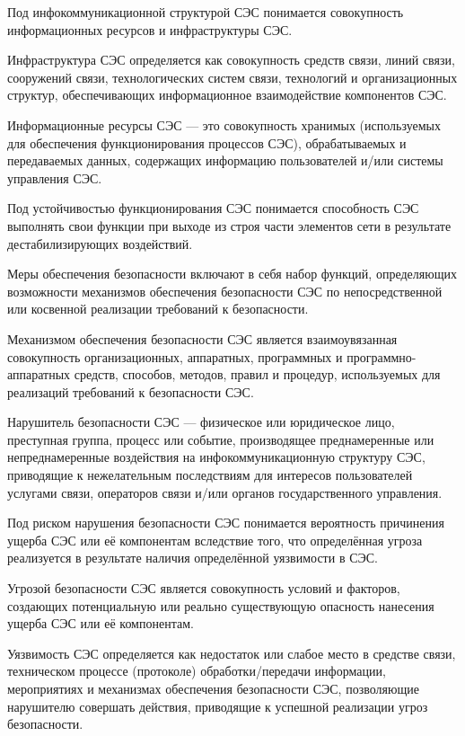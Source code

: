 \documentclass[12pt, russian, oneside, article]{ncc}
\begin{document}
Под инфокоммуникационной структурой СЭС понимается совокупность информационных ресурсов и инфраструктуры СЭС.

Инфраструктура СЭС определяется как совокупность средств связи, линий связи, сооружений связи, технологических систем связи, технологий и организационных структур, обеспечивающих информационное взаимодействие компонентов СЭС.

Информационные ресурсы СЭС --- это совокупность хранимых (используемых для обеспечения функционирования процессов СЭС), обрабатываемых и передаваемых данных, содержащих информацию пользователей и/или системы управления СЭС.

Под устойчивостью функционирования СЭС понимается способность СЭС выполнять свои функции при выходе из строя части элементов сети в результате дестабилизирующих воздействий.

Меры обеспечения безопасности включают в себя набор функций, определяющих возможности механизмов обеспечения безопасности СЭС по непосредственной или косвенной реализации требований к безопасности.

Механизмом обеспечения безопасности СЭС является взаимоувязанная совокупность организационных, аппаратных, программных и программно-аппаратных средств, способов, методов, правил и процедур, используемых для реализаций требований к безопасности СЭС.

Нарушитель безопасности СЭС --- физическое или юридическое лицо, преступная группа, процесс или событие, производящее преднамеренные или непреднамеренные воздействия на инфокоммуникационную структуру СЭС, приводящие к нежелательным последствиям для интересов пользователей услугами связи, операторов связи и/или органов государственного управления.

Под риском нарушения безопасности СЭС понимается вероятность причинения ущерба СЭС или её компонентам вследствие того, что определённая угроза реализуется в результате наличия определённой уязвимости в СЭС.

Угрозой безопасности СЭС является совокупность условий и факторов, создающих потенциальную или реально существующую опасность нанесения ущерба СЭС или её компонентам.

Уязвимость СЭС определяется как недостаток или слабое место в средстве связи, техническом процессе (протоколе) обработки/передачи информации, мероприятиях и механизмах обеспечения безопасности СЭС, позволяющие нарушителю совершать действия, приводящие к успешной реализации угроз безопасности.
\end{document}
